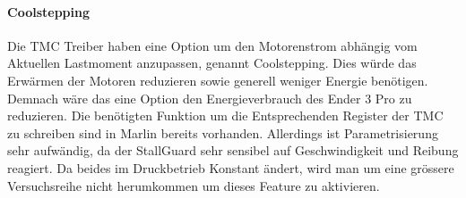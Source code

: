 \paragraph{Coolstepping}
Die TMC Treiber haben eine Option um den Motorenstrom abhängig vom Aktuellen Lastmoment anzupassen, genannt Coolstepping. Dies würde das Erwärmen der Motoren reduzieren sowie generell weniger Energie benötigen. Demnach wäre das eine Option den Energieverbrauch des Ender 3 Pro zu reduzieren. Die benötigten Funktion um die Entsprechenden Register der TMC zu schreiben sind in Marlin bereits vorhanden. Allerdings ist Parametrisierung sehr aufwändig, da der StallGuard sehr sensibel auf Geschwindigkeit und Reibung reagiert. Da beides im Druckbetrieb Konstant ändert, wird man um eine grössere Versuchsreihe nicht herumkommen um dieses Feature zu aktivieren. 


